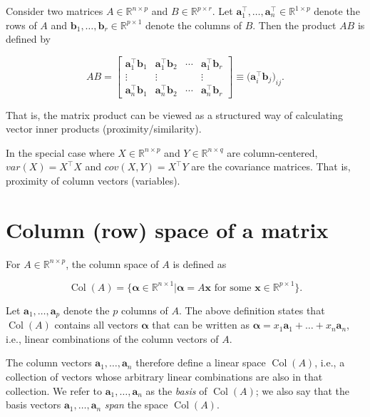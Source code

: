 \documentclass[
]{book}
\begin{document}
Consider two matrices \(A \in \mathbb{R}^{n \times p}\) and \(B \in \mathbb{R}^{p \times r}\). Let \(\mathbf{a}_1^\top, \dots, \mathbf{a}_n^\top \in \mathbb{R}^{1 \times p}\) denote the rows of \(A\) and \(\mathbf{b}_1, \dots, \mathbf{b}_r \in \mathbb{R}^{p \times 1}\) denote the columns of \(B\). Then the product \(AB\) is defined by

\[
AB = 
\left[
\begin{array}{cccc}
    \mathbf{a}_1^\top \mathbf{b}_1 & \mathbf{a}_1^\top \mathbf{b}_2 & \cdots & \mathbf{a}_1^\top \mathbf{b}_r \\
    \vdots & \vdots & & \vdots \\
    \mathbf{a}_n^\top \mathbf{b}_1 & \mathbf{a}_n^\top \mathbf{b}_2 & \cdots & \mathbf{a}_n^\top \mathbf{b}_r 
\end{array}
\right] \equiv \bigl(\mathbf{a}_i^\top \mathbf{b}_j \bigr)_{ij}.
\]

That is, the matrix product can be viewed as a structured way of calculating vector inner products (proximity/similarity).

In the special case where \(X \in \mathbb{R}^{n \times p}\) and \(Y \in \mathbb{R}^{n \times q}\) are column-centered, \(var(X) = X^\top X\) and \(cov(X,Y) = X^\top Y\) are the covariance matrices. That is, proximity of column vectors (variables).

\section{Column (row) space of a matrix}\label{column-row-space-of-a-matrix}

For \(A \in \mathbb{R}^{n \times p}\), the column space of \(A\) is defined as

\[
\operatorname{Col}(A) = \bigl\{ \mathbf \alpha \in \mathbb{R}^{n \times 1} \big | \mathbf \alpha = A\mathbf x \text{ for some } \mathbf x \in \mathbb{R}^{p \times 1} \bigr\}.
\]

Let \(\mathbf{a}_1, \dots, \mathbf{a}_p\) denote the \(p\) columns of \(A\). The above definition states that \(\operatorname{Col}(A)\) contains all vectors \(\mathbf \alpha\) that can be written as \(\mathbf \alpha = x_1 \mathbf{a}_1 + \ldots + x_n \mathbf{a}_n\), i.e., linear combinations of the column vectors of \(A\).

The column vectors \(\mathbf{a}_1, \ldots, \mathbf{a}_n\) therefore define a linear space \(\operatorname{Col}(A)\), i.e., a collection of vectors whose arbitrary linear combinations are also in that collection. We refer to \(\mathbf{a}_1, \ldots, \mathbf{a}_n\) as the \emph{basis} of \(\operatorname{Col}(A)\); we also say that the basis vectors \(\mathbf{a}_1, \ldots, \mathbf{a}_n\) \emph{span} the space \(\operatorname{Col}(A)\).
\end{document}
